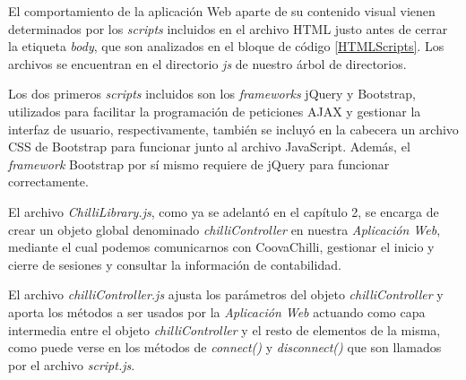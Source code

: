 El comportamiento de la aplicación Web aparte de su contenido visual vienen determinados por los \emph{scripts} incluidos en el archivo HTML justo antes de cerrar la etiqueta \emph{body}, que son analizados en el bloque de código \ref{HTMLScripts}. Los archivos se encuentran en el directorio \emph{js} de nuestro árbol de directorios.

Los dos primeros \emph{scripts} incluidos son los \emph{frameworks} jQuery y Bootstrap, utilizados para facilitar la programación de peticiones AJAX y gestionar la interfaz de usuario, respectivamente, también se incluyó en la cabecera un archivo CSS de Bootstrap para funcionar junto al archivo JavaScript. Además, el \emph{framework} Bootstrap por sí mismo requiere de jQuery para funcionar correctamente.


El archivo \emph{ChilliLibrary.js}, como ya se adelantó en el capítulo 2, se encarga de crear un objeto global denominado \emph{chilliController} en nuestra \emph{Aplicación Web}, mediante el cual podemos comunicarnos con CoovaChilli, gestionar el inicio y cierre de sesiones y consultar la información de contabilidad.

El archivo \emph{chilliController.js} ajusta los parámetros del objeto \emph{chilliController} y aporta los métodos a ser usados por la \emph{Aplicación Web} actuando como capa intermedia entre el objeto \emph{chilliController} y el resto de elementos de la misma, como puede verse en los métodos de \emph{connect()} y \emph{disconnect()} que son llamados por el archivo \emph{script.js}.


